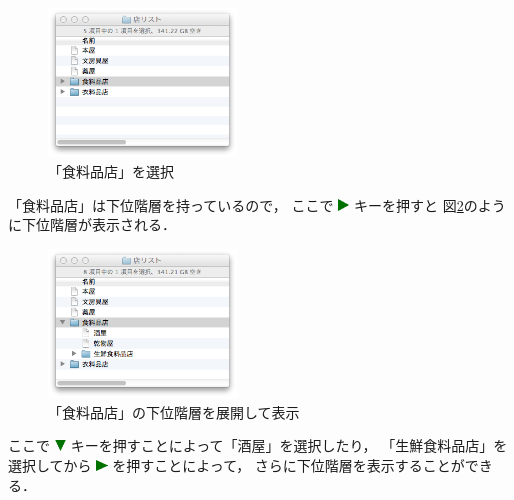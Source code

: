 \documentclass[twoside]{wiss}
\def\figwidth{50mm}
\def\down{ \includegraphics[width=3mm,bb=0 0 36 36]{figures/downtriangle.pdf} }
\def\right{ \includegraphics[width=3mm,bb=0 0 36 36]{figures/righttriangle.pdf} }
\begin{document}
\begin{figure}[H]
\centerline{\includegraphics[width=\figwidth,bb=0 0 344 272]{figures/c074cd6daec3da0341125d1492b8a09c.png}}
\caption{「食料品店」を選択}
\label{screenshot4}
\end{figure}

\noindent
「食料品店」は下位階層を持っているので，
ここで{\right}キーを押すと
図\ref{screenshot5}のように下位階層が表示される．

\begin{figure}[H]
\centerline{\includegraphics[width=\figwidth,bb=0 0 344 272]{figures/51d867d4721f65c18e84172c8818e137.png}}
\caption{「食料品店」の下位階層を展開して表示}
\label{screenshot5}
\end{figure}

\noindent
ここで{\down}キーを押すことによって「酒屋」を選択したり，
「生鮮食料品店」を選択してから{\right}を押すことによって，
さらに下位階層を表示することができる．
\end{document}
